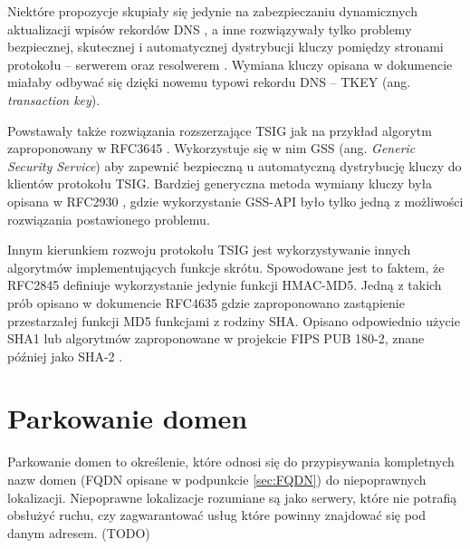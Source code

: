 Niektóre propozycje skupiały się jedynie na zabezpieczaniu dynamicznych aktualizacji wpisów rekordów DNS \cite{RFC2137}, a inne
rozwiązywały tylko problemy bezpiecznej, skutecznej i automatycznej dystrybucji kluczy pomiędzy stronami protokołu -- serwerem oraz
resolwerem \cite{RFC2930}. Wymiana kluczy opisana w dokumencie \cite{RFC2930} miałaby odbywać się dzięki nowemu typowi rekordu
DNS -- TKEY (ang. \textit{transaction key}).

Powstawały także rozwiązania rozszerzające TSIG jak na przykład algorytm zaproponowany w RFC3645 \cite{RFC3645}. Wykorzystuje się
w nim GSS \cite{RFC2743}(ang. \textit{Generic Security Service}) aby zapewnić bezpieczną u automatyczną dystrybucję kluczy do
klientów protokołu TSIG. Bardziej generyczna metoda wymiany kluczy była opisana w RFC2930 \cite{RFC2930}, gdzie wykorzystanie
GSS-API było tylko jedną z możliwości rozwiązania postawionego problemu.

Innym kierunkiem rozwoju protokołu TSIG jest wykorzystywanie innych algorytmów implementujących funkcje skrótu. Spowodowane
jest to faktem, że RFC2845 \cite{RFC2845} definiuje wykorzystanie jedynie funkcji HMAC-MD5. Jedną z takich prób opisano w
dokumencie RFC4635 \cite{RFC4635} gdzie zaproponowano zastąpienie przestarzałej funkcji MD5 funkcjami z rodziny SHA. Opisano
odpowiednio użycie SHA1 \cite{RFC3174} lub algorytmów zaproponowane w projekcie FIPS PUB 180-2, znane później jako SHA-2 \cite{RFC4634}.

\section{Parkowanie domen}
Parkowanie domen to określenie, które odnosi się do przypisywania kompletnych nazw domen (FQDN opisane w podpunkcie \ref{sec:FQDN})
do niepoprawnych lokalizacji. Niepoprawne lokalizacje rozumiane są jako serwery, które nie potrafią obsłużyć ruchu, czy zagwarantować
usług które powinny znajdować się pod danym adresem. (TODO)
